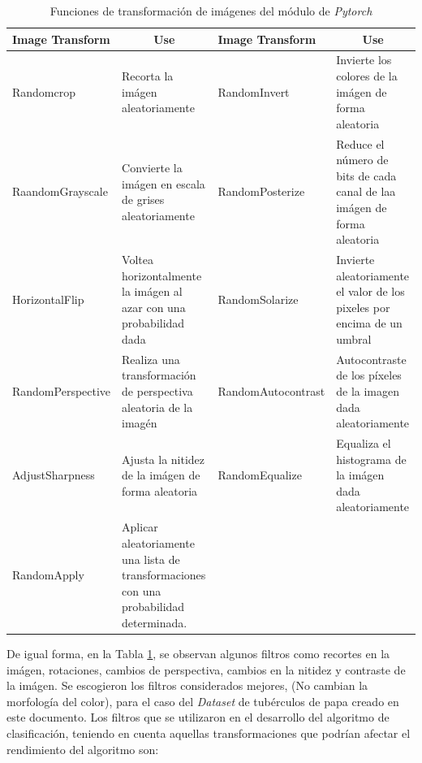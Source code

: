 			\begin{table}[ht]
				\centering
				\begin{tabular}{|p{3.5cm}|p{3.5cm}|p{3.8cm}|p{3.5cm}|}
					\hline
					Image Transform       & \multicolumn{1}{c|}{Use}                                                               & Image Transform       & \multicolumn{1}{c|}{Use}                                                \\ \hline
					Randomcrop            & Recorta la imágen aleatoriamente                                                       & RandomInvert          & Invierte los colores de la imágen de forma aleatoria                    \\ \hline
					RaandomGrayscale      & Convierte la imágen en escala de grises aleatoriamente                                 & RandomPosterize       & Reduce el número de bits de cada canal de laa imágen de forma aleatoria \\ \hline
					HorizontalFlip  & Voltea horizontalmente la imágen al azar con una probabilidad dada                     & RandomSolarize        & Invierte aleatoriamente el valor de los pixeles por encima de un umbral \\ \hline
					RandomPerspective     & Realiza una transformación de perspectiva aleatoria de la imagén                       & RandomAutocontrast    & Autocontraste de los píxeles de la imagen dada aleatoriamente           \\ \hline
					AdjustSharpness & Ajusta la nitidez de la imágen de forma aleatoria                                      & RandomEqualize        & Equaliza el histograma de la imágen dada aleatoriamente                 \\ \hline
					RandomApply           & Aplicar aleatoriamente una lista de transformaciones con una probabilidad determinada. & \multicolumn{1}{l|}{} &                                                                         \\ \hline
				\end{tabular}				
				\caption{Funciones de transformación de imágenes del módulo de \textit{Pytorch}}
				\label{table:filters2}
			\end{table}

			\newpage
			De igual forma, en la Tabla \ref{table:filters2}, se observan algunos filtros como recortes en la imágen, rotaciones, cambios de perspectiva, cambios en la nitidez y contraste de la imágen. Se escogieron los filtros considerados mejores, (No cambian la morfología del color), para el caso del \textit{Dataset} de tubérculos de papa creado en este documento. Los filtros que se utilizaron en el desarrollo del algoritmo de clasificación, teniendo en cuenta aquellas transformaciones que podrían afectar el rendimiento del algoritmo son:
			
